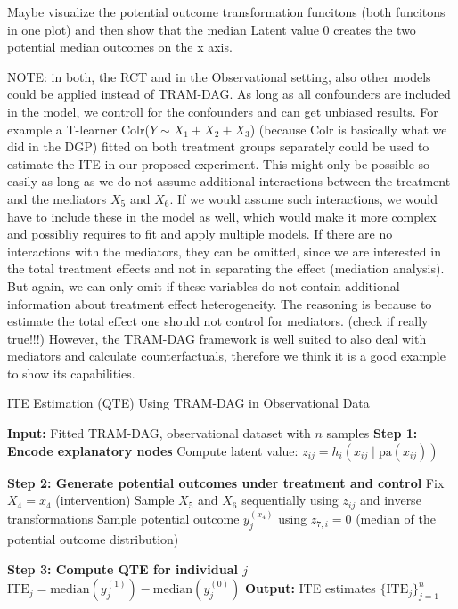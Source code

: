 Maybe visualize the potential outcome transformation funcitons (both funcitons in one plot) and then show that the median Latent value 0 creates the two potential median outcomes on the x axis.

NOTE: in both, the RCT and in the Observational setting, also other models could be applied instead of TRAM-DAG. As long as all confounders are included in the model, we controll for the confounders and can get unbiased results. For example a T-learner Colr($Y \sim X_1 + X_2 + X_3$) (because Colr is basically what we did in the DGP) fitted on both treatment groups separately could be used to estimate the ITE in our proposed experiment. This might only be possible so easily as long as we do not assume additional interactions between the treatment and the mediators $X_5$ and $X_6$. If we would assume such interactions, we would have to include these in the model as well, which would make it more complex and possibliy requires to fit and apply multiple models. If there are no interactions with the mediators, they can be omitted, since we are interested in the total treatment effects and not in separating the effect (mediation analysis). But again, we can only omit if these variables do not contain additional information about treatment effect heterogeneity. The reasoning is because to estimate the total effect one should not control for mediators. (check if really true!!!)  However, the TRAM-DAG framework is well suited to also deal with mediators and calculate counterfactuals, therefore we think it is a good example to show its capabilities.


\begin{algorithm}
\caption{ITE Estimation (QTE) Using TRAM-DAG in Observational Data}
\label{alg:ite_qte}
\begin{algorithmic}[1]
\State \textbf{Input:} Fitted TRAM-DAG, observational dataset with $n$ samples
  \State \textbf{Step 1: Encode explanatory nodes}
    \State Compute latent value: $z_{ij} = h_i(x_{ij} \mid \text{pa}(x_{ij}))$
  \EndFor

  \State \textbf{Step 2: Generate potential outcomes under treatment and control}
   
    \State Fix $X_4 = x_4$ (intervention)
    \State Sample $X_5$ and $X_6$ sequentially using $z_{ij}$ and inverse transformations
    \State Sample potential outcome $y_j^{(x_4)}$ using $z_{7,i} = 0$ (median of the potential outcome distribution)

  \EndFor

  \State \textbf{Step 3: Compute QTE for individual $j$}
  \State $\text{ITE}_j = \text{median}(y_j^{(1)}) - \text{median}(y_j^{(0)})$
\EndFor
\State \textbf{Output:} ITE estimates $\{\text{ITE}_j\}_{j=1}^n$
\end{algorithmic}
\end{algorithm}





